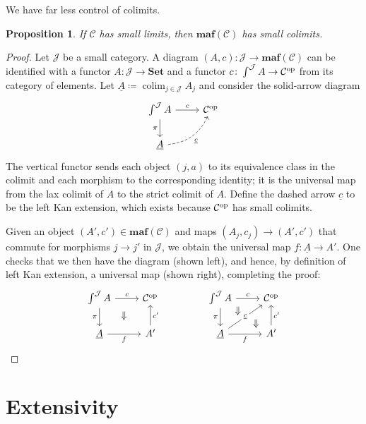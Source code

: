 \documentclass[11pt, one side, article]{memoir}
\theoremstyle{definition}
\theoremstyle{plain}
\newtheorem{proposition}[definitionx]{Proposition}
\DeclareMathOperator*{\colim}{colim}
\newcommand{\cat}[1]{\mathcal{#1}}%
\newcommand{\Cat}[1]{\mathbf{#1}}%
\newcommand{\op}{^\tn{op}}
\newcommand{\tn}[1]{\textnormal{#1}}
\newcommand{\ul}[1]{\underline{#1}}
\newcommand{\smset}{\Cat{Set}}
\newcommand{\0}{\Cat{0}}
\newcommand{\1}{\Cat{1}}
\newcommand{\opfam}{\Cat{maf}}
\begin{document}
We have far less control of colimits.

\begin{proposition}\label{prop.limits_to_colimits}
If $\cat{C}$ has small limits, then $\opfam(\cat{C})$ has small colimits.
\end{proposition}
\begin{proof}
Let $\cat{J}$ be a small category. A diagram $(A,c)\colon \cat{J}\to \opfam(\cat{C})$ can be identified with a functor $A\colon \cat{J}\to \smset$ and a functor $c\colon \int^\cat{J}A\to\cat{C}\op$ from its category of elements. Let $\ul{A}\coloneqq\colim_{j\in \cat{J}}A_j$ and consider the solid-arrow diagram
\[
\begin{tikzcd}
	\int^\cat{J}A\ar[r, "c"]\ar[d, "\pi"']&
	\cat{C}\op\\
	\ul{A}\ar[ur, bend right, dashed, "\ul{c}"']
\end{tikzcd}
\]
The vertical functor sends each object $(j,a)$ to its equivalence class in the colimit and each morphism to the corresponding identity; it is the universal map from the lax colimit of $A$ to the strict colimit of $A$. Define the dashed arrow $\ul{c}$ to be the left Kan extension, which exists because $\cat{C}\op$ has small colimits.

Given an object $(A',c')\in\opfam(\cat{C})$ and maps $(A_j,c_j)\to(A',c')$ that commute for morphisms $j\to j'$ in $\cat{J}$, we obtain the universal map $f\colon\ul{A}\to A'$. One checks that we then have the diagram (shown left), and hence, by definition of left Kan extension, a universal map (shown right), completing the proof:
\[
\begin{tikzcd}
	\int^\cat{J}A\ar[r, "c"]\ar[d, "\pi"']&
	\cat{C}\op\\
	\ul{A}\ar[r, "f"']&A'\ar[u, "c'"']\ar[ul, phantom, pos=.6, "\Downarrow"]
\end{tikzcd}
\hspace{.6in}
\begin{tikzcd}
	\int^\cat{J}A\ar[r, "c"]\ar[d, "\pi"']&
	\cat{C}\op\\
	\ul{A}\ar[r, "f"']\ar[ur, "\ul{c}" description]&A'\ar[u, "c'"']
	\ar[ul, phantom, pos=.2, "\Downarrow"]\ar[ul, phantom, pos=.85, "\Downarrow"]
\end{tikzcd}
\qedhere
\]
\end{proof}

\section{Extensivity}
\end{document}
